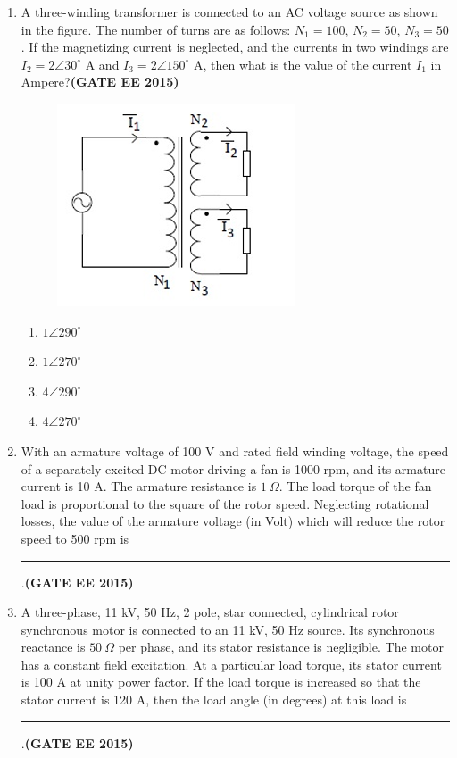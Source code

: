 \documentclass[a4paper,12pt]{exam}
\theoremstyle{remark}
\begin{document}
\begin{enumerate}
\item A three-winding transformer is connected to an AC voltage source as shown in the figure. The number of turns are as follows: $N_1 = 100$, $N_2 = 50$, $N_3 = 50$. If the magnetizing current is neglected, and the currents in two windings are $I_2 = 2\angle30^\circ$ A and $I_3 = 2\angle150^\circ$ A, then what is the value of the current $I_1$ in Ampere?\hfill{\textbf{(GATE EE 2015)}}
\begin{figure}[H]
    \centering
    \includegraphics[width=0.5\columnwidth]{figs/2Q 57.png}
    \caption{}
    \label{fig:placeholder}
\end{figure}
\begin{multicols}{4}
    \begin{enumerate}
        \item $1\angle 290^\circ$
        \item $1\angle 270^\circ$
        \item $4\angle 290^\circ$
        \item $4\angle 270^\circ$
    \end{enumerate}
\end{multicols}
\item With an armature voltage of 100 V and rated field winding voltage, the speed of a separately excited DC motor driving a fan is 1000 rpm, and its armature current is 10 A. The armature resistance is $1~\Omega$. The load torque of the fan load is proportional to the square of the rotor speed. Neglecting rotational losses, the value of the armature voltage (in Volt) which will reduce the rotor speed to 500 rpm is \rule{3cm}{0.15mm}.\hfill{\textbf{(GATE EE 2015)}}

\item A three-phase, 11 kV, 50 Hz, 2 pole, star connected, cylindrical rotor synchronous motor is connected to an 11 kV, 50 Hz source. Its synchronous reactance is $50~\Omega$ per phase, and its stator resistance is negligible. The motor has a constant field excitation. At a particular load torque, its stator current is 100 A at unity power factor. If the load torque is increased so that the stator current is 120 A, then the load angle (in degrees) at this load is \rule{3cm}{0.15mm}.\hfill{\textbf{(GATE EE 2015)}}


\end{enumerate}
\end{document}
